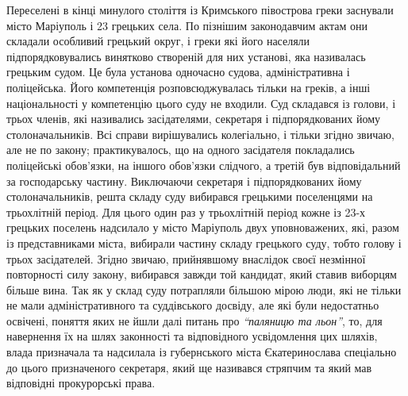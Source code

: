 \documentclass[a4paper,20pt]{report}
\begin{document}
Переселені в кінці минулого століття із Кримського півострова греки заснували
місто Маріуполь і 23 грецьких села. По пізнішим законодавчим актам они складали
особливий грецький округ, і греки які його населяли підпорядковувались
винятково створеній для них установі, яка називалась грецьким судом. Це була
установа одночасно судова, адміністративна і поліцейська. Його компетенція
розповсюджувалась тільки на греків, а інші національності у компетенцію цього
суду не входили. Суд складався із голови, і трьох членів, які називались
засідателями, секретаря і підпорядкованих йому столоначальників. Всі справи
вирішувались колегіально, і тільки згідно звичаю, але не по закону;
практикувалось, що на одного засідателя покладались поліцейські обов'язки, на
іншого обов'язки слідчого, а третій був відповідальний за господарську частину.
Виключаючи секретаря і підпорядкованих йому столоначальників, решта складу суду
вибирався грецькими поселенцями на трьохлітній період. Для цього один раз у
трьохлітній період кожне із 23-х грецьких поселень надсилало у місто Маріуполь
двух уповноважених, які, разом із представниками міста, вибирали частину складу
грецького суду, тобто голову і трьох засідателей. Згідно звичаю, прийнявшому
внаслідок своєї незмінної повторності силу закону, вибирався завжди той
кандидат, який ставив виборцям більше вина.
Так як у склад суду потрапляли більшою мірою люди, які не тільки не мали адміністративного та суддівського досвіду,
але які були недостатньо освічені, поняття яких не йшли далі питань про \emph{``паляницю та льон''}, то, для навернення
їх на шлях законності та відповідного усвідомлення цих шляхів, влада призначала та надсилала із губернського міста 
Єкатеринослава спеціально до цього призначеного секретаря, який ще називався стряпчим та який мав відповідні
прокурорські права.
\end{document}
